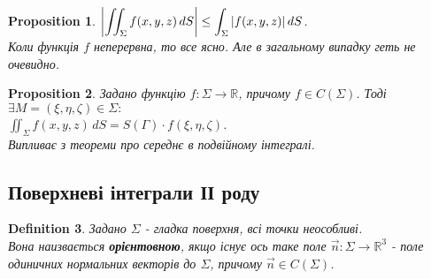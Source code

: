 \documentclass[a4paper, 10pt]{article}
\theoremstyle{theoremdd}
\newtheorem{theorem}{Theorem}[subsection]
\theoremstyle{theoremdd}
\newtheorem{definition}[theorem]{Definition}
\theoremstyle{theoremdd}
\theoremstyle{theoremdd}
\theoremstyle{theoremdd}
\theoremstyle{theoremdd}
\theoremstyle{theoremdd}
\theoremstyle{theoremdd}
\theoremstyle{theoremdd}
\newtheorem{proposition}[theorem]{Proposition}
\theoremstyle{theoremdd}
\theoremstyle{theoremdd}
\theoremstyle{theoremdd}
\theoremstyle{theoremdd}
\theoremstyle{theoremdd}
\newtheorem{corollary}[theorem]{Corollary}
\theoremstyle{theoremdd}
\begin{document}
\begin{proposition}
$\displaystyle \abs{\iint_\Sigma f(x,y,z)\,dS} \leq \int_\Sigma |f(x,y,z)|\,dS$.\\
\textit{Коли функція $f$ неперервна, то все ясно. Але в загальному випадку геть не очевидно.}
\end{proposition}

\begin{proposition}
Задано функцію $f: \Sigma \to \mathbb{R}$, причому $f \in C(\Sigma)$. Тоді $\exists M = (\xi,\eta,\zeta) \in \Sigma:$\\
$\displaystyle\iint_\Sigma f(x,y,z)\,dS = S(\Gamma) \cdot f(\xi,\eta,\zeta)$.\\
\textit{Випливає з теореми про середнє в подвійному інтегралі.}
\end{proposition}

\iffalse
\begin{theorem}
Маємо $\vec{r_1},\vec{r_2}$ на відповідно $D_1, D_2$ (дві замкнені області) - дві параметризації однієї й той самої поверхні. Тоді\\
$\displaystyle\iint_{\Sigma_1} f(x,y,z)\,dS = \iint_{\Sigma_2} f(x,y,z)\,dS$.\\
Тобто поверхневий інтеграл І роду не залежить від параметризації та орієнтації. (про орієнтацію поверхні буде згодом)
\end{theorem}

Дійсно, неважливо, $\Gamma_1 = \Gamma_2$ чи $\Gamma_1 = -\Gamma_2$, ми отримаємо одну й ту саму криву $\Gamma$. У всіх випадках будуть одне й те саме розбиття $\tau_\Gamma$, обрані точки $N$. Тож від цього криволінійний інтеграл І роду не має залежність.


\begin{corollary}
Маємо криві $\Gamma_1, \Gamma_2$ під умовами теореми вище. Тоді $L(\Gamma_1) = L(\Gamma_2)$.
\end{corollary}
\fi

\subsection{Поверхневі інтеграли ІІ роду}
\begin{definition}
Задано $\Sigma$ - гладка поверхня, всі точки неособливі.\\
Вона наизвається \textbf{орієнтовною}, якщо існує ось таке поле $\vec{n}: \Sigma \to \mathbb{R}^3$ - поле одиничних нормальних векторів до $\Sigma$, причому $\vec{n} \in C(\Sigma)$.
\end{definition}
\end{document}
